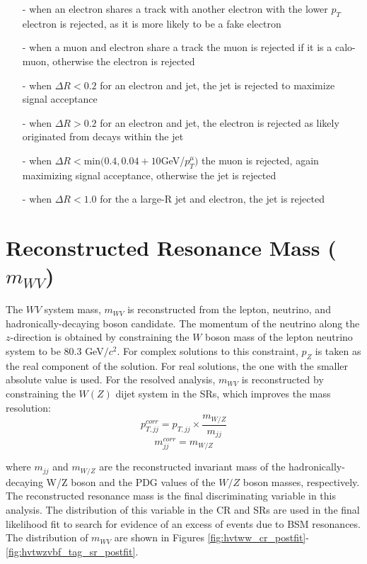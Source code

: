 \begin{itemize}
\item[-] when an electron shares a track with another electron with the lower $p_{T}$ electron is rejected, as it is more likely to be a fake electron
\item[-] when a muon and electron share a track the muon is rejected if it is a calo-muon, otherwise the electron is rejected
\item[-] when $\Delta R < 0.2$ for an electron and jet, the jet is rejected to maximize signal acceptance
\item[-] when $\Delta R > 0.2$ for an electron and jet, the electron is rejected as likely originated from decays within the jet
\item[-] when $\Delta R <$min$(0.4, 0.04+10$GeV/$p_{T}^{\mu})$ the muon is rejected, again maximizing signal acceptance, otherwise the jet is rejected
\item[-] when $\Delta R < 1.0$ for the a large-R jet and electron, the jet is rejected

\end{itemize}

\section{Reconstructed Resonance Mass ($m_{WV}$)}
\label{mwv}
The $WV$ system mass, $m_{WV}$ is reconstructed from the lepton, neutrino, and hadronically-decaying boson candidate. The momentum of the neutrino along the $z$-direction is obtained by constraining the $W$ boson mass of the lepton neutrino system to be  80.3 GeV$/c^{2}$. For complex solutions to this constraint, $p_{Z}$ is taken as the real component of the solution. For real solutions, the one with the smaller absolute value is used. For the resolved analysis, $m_{WV}$ is reconstructed by constraining the $W(Z)$ dijet system in the SRs, which improves the mass resolution:
\begin{equation}
p^{corr}_{T,jj} = p_{T,jj} \times \frac{m_{W/Z}}{m_{jj}}
\end{equation}
\begin{equation}
m^{corr}_{jj}=m_{W/Z}
\end{equation}

where $m_{jj}$ and $m_{W/Z}$ are the reconstructed invariant mass of the hadronically-decaying W/Z boson and the PDG values of the $W/Z$ boson masses, respectively. The reconstructed resonance mass is the final discriminating variable in this analysis. The distribution of this variable in the CR and SRs are used in the final likelihood fit to search for evidence of an excess of events due to BSM resonances. The distribution of $m_{WV}$ are shown in Figures \ref{fig:hvtww_cr_postfit}-\ref{fig:hvtwzvbf_tag_sr_postfit}. 
